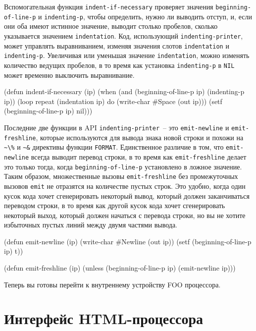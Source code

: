 Вспомогательная функция \lstinline{indent-if-necessary} проверяет значения
\lstinline{beginning-of-line-p} и \lstinline{indenting-p}, чтобы определить, нужно ли
выводить отступ, и, если они оба имеют истинное значение, выводит столько пробелов,
сколько указывается значением \lstinline{indentation}. Код, использующий
\lstinline{indenting-printer}, может управлять выравниванием, изменяя значения слотов
\lstinline{indentation} и \lstinline{indenting-p}. Увеличивая или уменьшая значение
\lstinline{indentation}, можно изменять количество ведущих пробелов, в то время как
установка \lstinline{indenting-p} в \lstinline{NIL} может временно выключить выравнивание.

\begin{myverb}
(defun indent-if-necessary (ip)
  (when (and (beginning-of-line-p ip) (indenting-p ip))
    (loop repeat (indentation ip) do (write-char #\bslash{}Space (out ip)))
    (setf (beginning-of-line-p ip) nil)))
\end{myverb}

Последние две функции в API \lstinline{indenting-printer}~-- это \lstinline{emit-newline} и
\lstinline{emit-freshline}, которые используются для вывода знака новой строки и похожи на
\lstinline!~\%! и \lstinline!~&! директивы функции \lstinline{FORMAT}. Единственное различие в
том, что \lstinline{emit-newline} всегда выводит перевод строки, в то время как
\lstinline{emit-freshline} делает это только тогда, когда \lstinline{beginning-of-line-p}
установлено в ложное значение. Таким образом, множественные вызовы \lstinline{emit-freshline}
без промежуточных вызовов \lstinline{emit} не отразятся на количестве пустых строк. Это удобно,
когда один кусок кода хочет сгенерировать некоторый вывод, который должен заканчиваться
переводом строки, в то время как другой кусок кода хочет сгенерировать некоторый выход,
который должен начаться с перевода строки, но вы не хотите избыточных пустых линий между
двумя частями вывода.

\begin{myverb}
(defun emit-newline (ip)
  (write-char #\bslash{}Newline (out ip))
  (setf (beginning-of-line-p ip) t))

(defun emit-freshline (ip)
  (unless (beginning-of-line-p ip) (emit-newline ip)))
\end{myverb}

Теперь вы готовы перейти к внутреннему устройству FOO процессора. 

\section{Интерфейс HTML-процессора}

